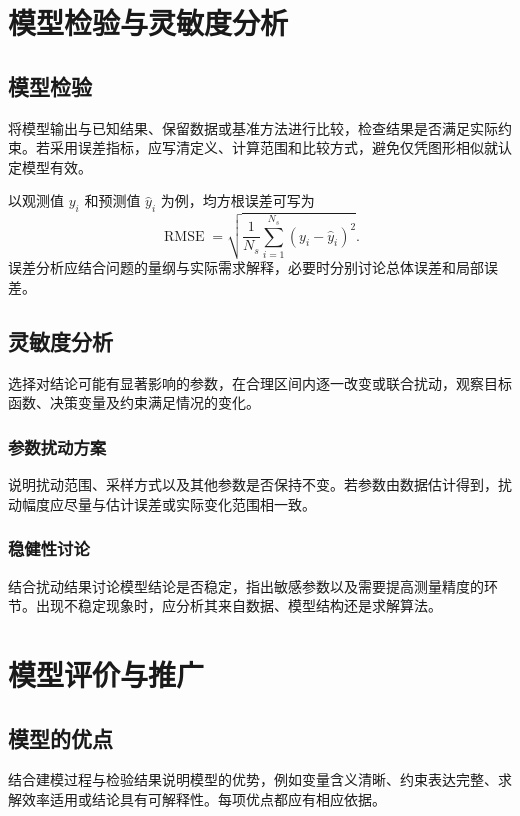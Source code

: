 \documentclass{gmcmthesis}
\begin{document}
\section{模型检验与灵敏度分析}
\label{sec:validation}

\subsection{模型检验}
将模型输出与已知结果、保留数据或基准方法进行比较，检查结果是否满足实际约束。若采用误差指标，应写清定义、计算范围和比较方式，避免仅凭图形相似就认定模型有效。

以观测值 $y_i$ 和预测值 $\hat y_i$ 为例，均方根误差可写为
\begin{equation}
  \operatorname{RMSE}
  =\sqrt{\frac{1}{N_s}\sum_{i=1}^{N_s}(y_i-\hat y_i)^2}.
\end{equation}
误差分析应结合问题的量纲与实际需求解释，必要时分别讨论总体误差和局部误差。

\subsection{灵敏度分析}
选择对结论可能有显著影响的参数，在合理区间内逐一改变或联合扰动，观察目标函数、决策变量及约束满足情况的变化。

\subsubsection{参数扰动方案}
说明扰动范围、采样方式以及其他参数是否保持不变。若参数由数据估计得到，扰动幅度应尽量与估计误差或实际变化范围相一致。

\subsubsection{稳健性讨论}
结合扰动结果讨论模型结论是否稳定，指出敏感参数以及需要提高测量精度的环节。出现不稳定现象时，应分析其来自数据、模型结构还是求解算法。

\section{模型评价与推广}

\subsection{模型的优点}
结合建模过程与检验结果说明模型的优势，例如变量含义清晰、约束表达完整、求解效率适用或结论具有可解释性。每项优点都应有相应依据。
\end{document}
